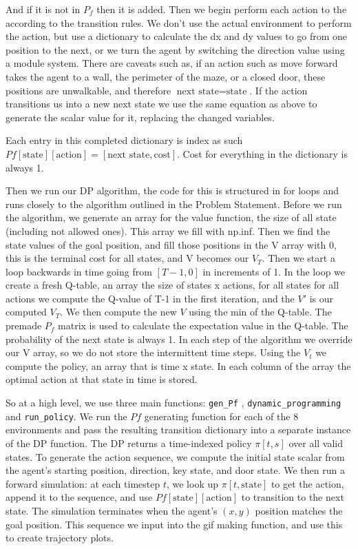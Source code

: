 \documentclass[conference]{IEEEtran}
\begin{document}
And if it is not in $P_f$ then it is added.
Then we begin perform each action to the according to the transition rules. We don't use the actual environment to perform the action, but use a dictionary to calculate the 
dx and dy values to go from one position to the next, or we turn the agent by switching the direction value using a module system.
There are caveats such as, if an action such as move forward takes the agent to a wall, the perimeter of the maze, or a closed door, these positions are unwalkable, 
and therefore $\text{next state} = \text{state}$. 
If the action transitions us into a new next state we use the same equation as above to generate the scalar value for it, replacing the changed variables.

Each entry in this completed dictionary is index as such $Pf[\text{state}][\text{action}] = [\text{next state}, \text{cost}]$. 
Cost for everything in the dictionary is always 1.

Then we run our DP algorithm, the code for this is structured in for loops and runs closely to the algorithm outlined in the Problem Statement.
Before we run the algorithm, we generate an array for the value function, the size of all state (including not allowed ones). This array we fill with np.inf.
Then we find the state values of the goal position, and fill those positions in the V array with 0, this is the terminal cost for all states, and V becomes our $V_T$.
Then we start a loop backwards in time going from $[T-1, 0]$ in increments of 1. In the loop we create a fresh Q-table, an array the size of states x actions,
for all states for all actions we compute the Q-value of T-1 in the first iteration, and the $V'$ is our computed $V_T$. We then compute the new $V$ using the min of the Q-table.
The premade $P_f$ matrix is used to calculate the expectation value in the Q-table. The probability of the next state is always 1.
In each step of the algorithm we override our V array, so we do not store the intermittent time steps. Using the $V_t$ we compute the policy, an array that is time x state.
In each column of the array the optimal action at that state in time is stored.

So at a high level, we use three main functions: \texttt{gen\_Pf} , \texttt{dynamic\_programming} and \texttt{run\_policy}. We run the $Pf$ generating function for each of the 8 environments and pass the resulting transition dictionary into a separate instance of the DP function. 
The DP returns a time-indexed policy $\pi[t, s]$ over all valid states. To generate the action sequence, we compute the initial state scalar from the agent's starting 
position, direction, key state, and door state. We then run a forward simulation: at each timestep $t$, we look up $\pi[t, \text{state}]$ to get the action, append it to 
the sequence, and use $Pf[\text{state}][\text{action}]$ to transition to the next state. The simulation terminates when the agent's $(x, y)$ position matches the goal 
position. This sequence we input into the gif making function, and use this to create trajectory plots.
\end{document}
